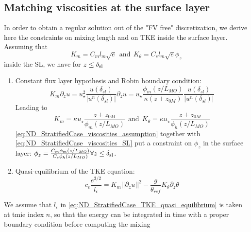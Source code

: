 \subsection{Matching viscosities at the surface layer}
In order to obtain a regular solution out of the "FV free"
discretization, we derive here the constraints on mixing length
and on TKE inside the surface layer.
Assuming that 
\begin{equation}
	\label{eq:ND_StratifiedCase_viscosities_assumption}
K_m = C_m l_m \sqrt{e} ~~\text{and}~~
K_\theta = C_s l_m \sqrt{e} \phi_z
\end{equation}
 inside the SL, we have
for $z\leq \delta_{\rm sl}$
\begin{enumerate}
\item Constant flux layer hypothesis and Robin boundary condition:
\begin{subequations}
\begin{equation}
	\label{eq:ND_StratifiedCase_K_partial_z_u}
	K_m \partial_z u = u_\star^2 \frac{u(\delta_{sl})}{|u^n(\delta_{sl})|}
\end{equation}
\begin{equation}
	\label{eq:ND_StratifiedCase_partial_z_u}
	\partial_z u = u_\star \frac{\phi_m(z/L_{MO})}{\kappa (z + z_{0M})}\frac{u(\delta_{sl})}{|u^n(\delta_{sl})|}
\end{equation}
\end{subequations}
Leading to 
\begin{equation}
	\label{eq:ND_StratifiedCase_viscosities_SL}
	K_m = \kappa u_\star\frac{z+ z_{0M}}{\phi_m(z/L_{MO})} ~~\text{and}~~
K_\theta = \kappa u_\star\frac{z+ z_{0M}}{\phi_h(z/L_{MO})}
\end{equation}
\eqref{eq:ND_StratifiedCase_viscosities_assumption}
together with \eqref{eq:ND_StratifiedCase_viscosities_SL} put
a constraint on $\phi_z$ in the surface layer:
$\phi_z = \frac{C_m\phi_m(z/L_{MO})}{C_s\phi_h(z/L_{MO})}
		\forall z\leq \delta_{\rm sl}$.
\item Quasi-equilibrium of the TKE equation:
\begin{equation}
	\label{eq:ND_StratifiedCase_TKE_quasi_equilibrium}
	c_\epsilon \frac{e^{3/2}}{l_\epsilon}=K_m ||\partial_z u||^2 - \frac{g}{\theta_{ref}} K_\theta \partial_z \theta
\end{equation}
\end{enumerate}
We assume that $l_\epsilon$ in
\eqref{eq:ND_StratifiedCase_TKE_quasi_equilibrium} is taken at
tmie index $n$, so that the energy can be integrated in time
with a proper boundary condition before computing the mixing
